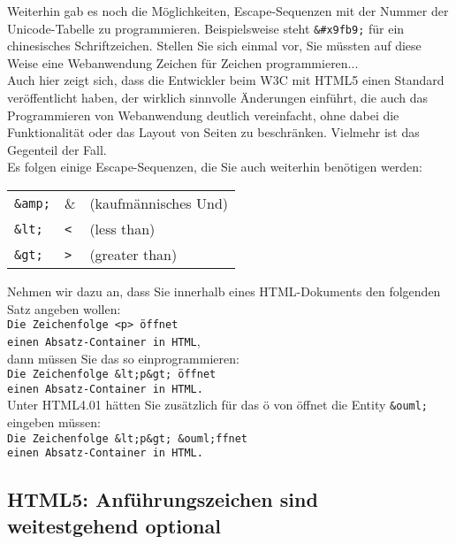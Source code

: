Weiterhin gab es noch die Möglichkeiten, Escape-Sequenzen mit der Nummer der Unicode-Tabelle zu programmieren. Beispielsweise steht \verb|&#x9fb9;| für ein chinesisches Schriftzeichen. Stellen Sie sich einmal vor, Sie müssten auf diese Weise eine Webanwendung Zeichen für Zeichen programmieren...\\

Auch hier zeigt sich, dass die Entwickler beim W3C mit HTML5 einen Standard veröffentlicht haben, der wirklich sinnvolle Änderungen einführt, die auch das Programmieren von Webanwendung deutlich vereinfacht, ohne dabei die Funktionalität oder das Layout von Seiten zu beschränken. Vielmehr ist das Gegenteil der Fall.\\

Es folgen einige Escape-Sequenzen, die Sie auch weiterhin benötigen werden:\\

\begin{tabular}{l l l}
	\verb|&amp;| & \& & (kaufmännisches Und)\\
	\verb|&lt;| & \verb|<| & (less than)\\
	\verb|&gt;| & \verb|>| & (greater than)\\
\end{tabular}

Nehmen wir dazu an, dass Sie innerhalb eines HTML-Dokuments den folgenden Satz angeben wollen:\\

\verb|Die Zeichenfolge <p> öffnet|\\\verb|einen Absatz-Container in HTML|, \\

dann müssen Sie das so einprogrammieren:\\

\verb|Die Zeichenfolge &lt;p&gt; öffnet|\\\verb|einen Absatz-Container in HTML.|\\

Unter HTML4.01 hätten Sie zusätzlich für das ö von öffnet die Entity \verb|&ouml;| eingeben müssen:\\

\verb|Die Zeichenfolge &lt;p&gt; &ouml;ffnet|\\\verb|einen Absatz-Container in HTML.|

\subsection{HTML5: Anführungszeichen sind weitestgehend optional}

